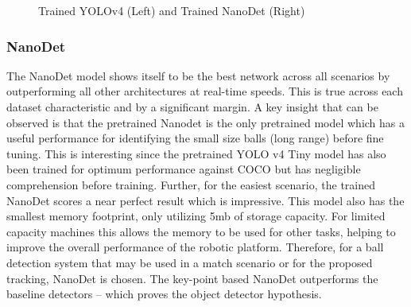 \documentclass[a4paper,twoside,12pt]{report}
\begin{document}
\begin{figure}[h!]
    \centering
    \qquad
    \caption{Trained YOLOv4 (Left) and Trained NanoDet (Right)}
\end{figure}

\subsubsection{NanoDet}

The NanoDet model shows itself to be the best network across all scenarios by outperforming all other architectures at real-time speeds. This is true across each dataset characteristic and by a significant margin. A key insight that can be observed is that the pretrained Nanodet is the only pretrained model which has a useful performance for identifying the small size balls (long range) before fine tuning. This is interesting since the pretrained YOLO v4 Tiny model has also been trained for optimum performance against COCO but has negligible comprehension before training. Further, for the easiest scenario, the trained NanoDet scores a near perfect result which is impressive. This model also has the smallest memory footprint, only utilizing 5mb of storage capacity. For limited capacity machines this allows the memory to be used for other tasks, helping to improve the overall performance of the robotic platform. Therefore, for a ball detection system that may be used in a match scenario or for the proposed tracking, NanoDet is chosen. The key-point based NanoDet outperforms the baseline detectors -- which proves the object detector hypothesis.
\end{document}
